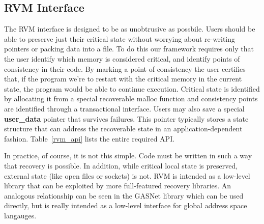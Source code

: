 \subsection{RVM Interface}
The RVM interface is designed to be as unobtrusive as possbile. Users should be
able to preserve just their critical state without worrying about re-writing
pointers or packing data into a file. To do this our framework requires only
that the user identify which memory is considered critical, and identify points
of consistency in their code. By marking a point of consistency the user
certifies that, if the program we're to restart with the critical memory in the
current state, the program would be able to continue execution. Critical state
is identified by allocating it from a special recoverable malloc function and
consistency points are identified through a transactional interface. Users may
also save a special {\bf user\_data} pointer that survives failures. This pointer
typically stores a state structure that can address the recoverable state in an
application-dependent fashion. Table~\ref{rvm_api} lists the entire required API.

\begin{table}[t!]
\centering
\caption{RVM API}
\label{tab:rvm_api}
\end{table}

In practice, of course, it is not this simple. Code must be written in such a
way that recovery is possible. In addition, while critical local state is
preserved, external state (like open files or sockets) is not. RVM is intended
as a low-level library that can be exploited by more full-featured recovery
libraries. An analogous relationship can be seen in the GASNet \cite{GASNET}
library which can be used directly, but is really intended as a low-level
interface for global address space langauges.
